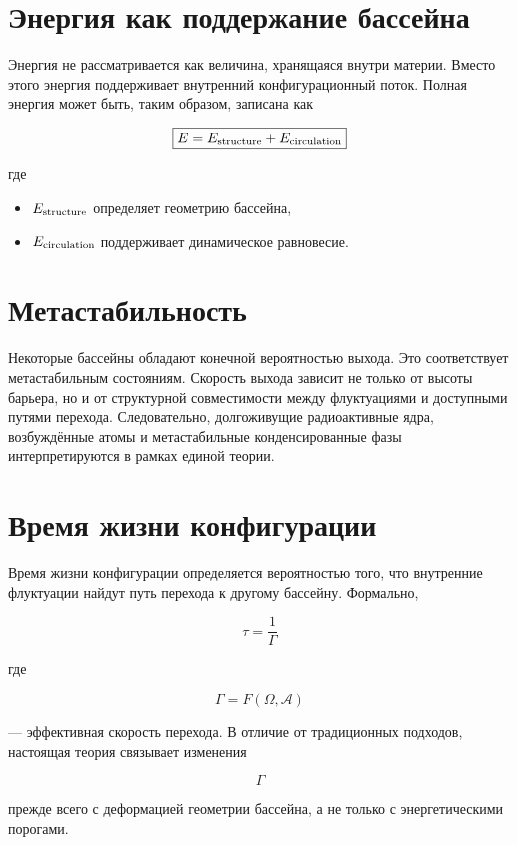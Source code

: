\section{Энергия как поддержание бассейна}

Энергия не рассматривается как величина, хранящаяся внутри материи. Вместо этого энергия поддерживает внутренний конфигурационный поток. Полная энергия может быть, таким образом, записана как

\[ \boxed{ E= E_{\rm structure} + E_{\rm circulation} } \]

где

\begin{itemize}

\item
\(E_{\rm structure}\)
определяет геометрию бассейна,

\item
\(E_{\rm circulation}\)
поддерживает динамическое равновесие.

\end{itemize}

\section{Метастабильность}

Некоторые бассейны обладают конечной вероятностью выхода. Это соответствует метастабильным состояниям. Скорость выхода зависит не только от высоты барьера, но и от структурной совместимости между флуктуациями и доступными путями перехода. Следовательно, долгоживущие радиоактивные ядра, возбуждённые атомы и метастабильные конденсированные фазы интерпретируются в рамках единой теории.

\section{Время жизни конфигурации}

Время жизни конфигурации определяется вероятностью того, что внутренние флуктуации найдут путь перехода к другому бассейну. Формально,

\[ \tau = \frac1{\Gamma} \]

где

\[ \Gamma = F(\Omega,\mathcal A) \]

— эффективная скорость перехода. В отличие от традиционных подходов, настоящая теория связывает изменения

\[ \Gamma \]

прежде всего с деформацией геометрии бассейна, а не только с энергетическими порогами.

